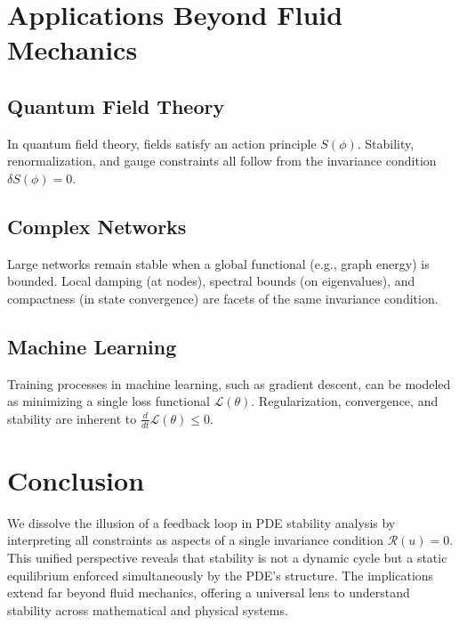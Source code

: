 \section{Applications Beyond Fluid Mechanics}

\subsection{Quantum Field Theory}
In quantum field theory, fields satisfy an action principle \(S(\phi)\). Stability, renormalization, and gauge constraints all follow from the invariance condition \(\delta S(\phi) = 0\).

\subsection{Complex Networks}
Large networks remain stable when a global functional (e.g., graph energy) is bounded. Local damping (at nodes), spectral bounds (on eigenvalues), and compactness (in state convergence) are facets of the same invariance condition.

\subsection{Machine Learning}
Training processes in machine learning, such as gradient descent, can be modeled as minimizing a single loss functional \(\mathcal{L}(\theta)\). Regularization, convergence, and stability are inherent to \(\frac{d}{dt} \mathcal{L}(\theta) \leq 0\).

\section{Conclusion}
We dissolve the illusion of a feedback loop in PDE stability analysis by interpreting all constraints as aspects of a single invariance condition \(\mathcal{R}(u) = 0\). This unified perspective reveals that stability is not a dynamic cycle but a static equilibrium enforced simultaneously by the PDE’s structure. The implications extend far beyond fluid mechanics, offering a universal lens to understand stability across mathematical and physical systems.

